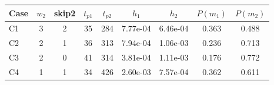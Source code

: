 \begin{tabular}{lcccccccc}
\toprule
Case & $w_2$ & skip2 & $t_{p1}$ & $t_{p2}$ & $h_1$ & $h_2$ & $P(m_1)$ & $P(m_2)$ \\
\midrule
C1 & 3 & 2 & 35 & 284 & 7.77e-04 & 6.46e-04 & 0.363 & 0.488 \\
C2 & 2 & 1 & 36 & 313 & 7.94e-04 & 1.06e-03 & 0.236 & 0.713 \\
C3 & 2 & 0 & 41 & 314 & 3.81e-04 & 1.11e-03 & 0.176 & 0.772 \\
C4 & 1 & 1 & 34 & 426 & 2.60e-03 & 7.57e-04 & 0.362 & 0.611 \\
\bottomrule
\end{tabular}